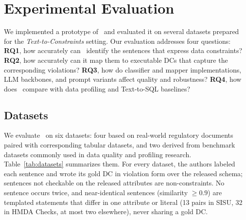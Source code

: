 


\section{Experimental Evaluation}
\label{sec:experiments}

We implemented a prototype of \system\ and evaluated it on several datasets prepared for the \emph{Text-to-Constraints} setting. Our evaluation addresses four questions: \textbf{RQ1}, how accurately can \system\ identify the sentences that express data constraints? \textbf{RQ2}, how accurately can it map them to executable DCs that capture the corresponding violations? \textbf{RQ3}, how do classifier and mapper implementations, LLM backbones, and prompt variants affect quality and robustness? \textbf{RQ4}, how does \system\ compare with data profiling and Text-to-SQL baselines?

\subsection{Datasets}
\label{sec:datasets}



We evaluate \system\ on six datasets: four based on real-world regulatory documents paired with corresponding tabular datasets, and two derived from benchmark datasets commonly used in data quality and profiling research. Table~\ref{tab:datasets} summarizes them. For every dataset, the authors labeled each sentence and wrote its gold DC in violation form over the released schema; sentences not checkable on the released attributes are non-constraints. No sentence occurs twice, and near-identical sentences (similarity $\geq 0.9$) are templated statements that differ in one attribute or literal (13 pairs in SISU, 32 in HMDA Checks, at most two elsewhere), never sharing a gold DC.



